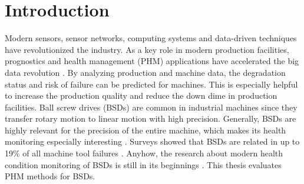 
\chapter{Introduction}
Modern sensors, sensor networks, computing systems and data-driven techniques have revolutionized the industry. As a key role in modern production facilities, prognostics and health management (PHM) applications have accelerated the big data revolution \cite{ZHAO2019213}. By analyzing production and machine data, the degradation status and risk of failure can be predicted for machines. This is especially helpful to increase the production quality and reduce the down dime in production facilities. Ball screw drives (BSDs) are common in industrial machines since they transfer rotary motion to linear motion with high precision. Generally, BSDs are highly relevant for the precision of the entire machine, which makes its health monitoring especially interesting \cite{LiPin2018}. Surveys showed that BSDs are related in up to 19\% of all machine tool failures \cite{Denkena2021}. Anyhow, the research about modern health condition monitoring of BSDs is still in its beginnings \cite{LiPin2018}. This thesis evaluates PHM methods for BSDs.


